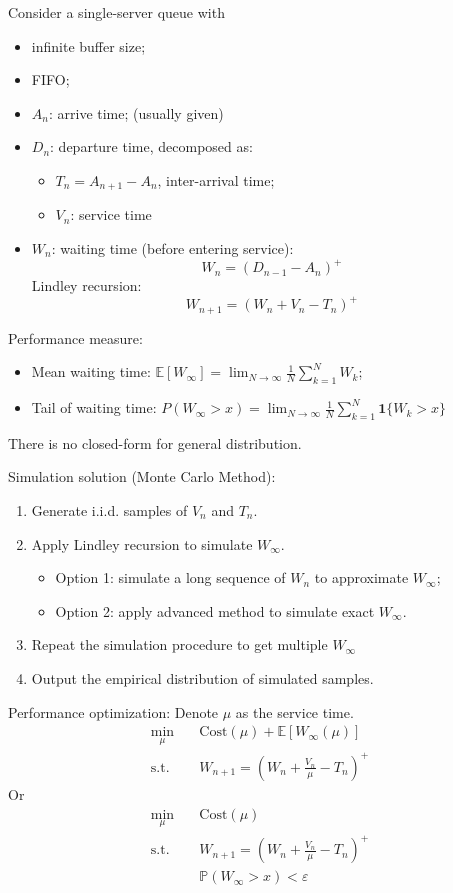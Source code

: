 \begin{example}
Consider a single-server queue with
\begin{itemize}
\item
infinite buffer size;
\item
FIFO;
\item
$A_n$: arrive time; (usually given)
\item
$D_n$: departure time, decomposed as:
\begin{itemize}
\item
$T_n=A_{n+1} - A_n$, inter-arrival time;
\item
$V_n$: service time
\end{itemize}
\item
$W_n$: waiting time (before entering service):
\[
W_n = (D_{n-1} - A_n)^+
\]
Lindley recursion:
\[
W_{n+1} = (W_n  + V_n - T_n)^+
\]
\end{itemize}
Performance measure:
\begin{itemize}
\item
Mean waiting time: $\mathbb{E}[W_\infty] = \lim_{N\to\infty}\frac{1}{N}\sum_{k=1}^NW_k$;
\item
Tail of waiting time: $P(W_\infty > x) = \lim_{N\to\infty}\frac{1}{N}\sum_{k=1}^N\bm 1\{W_k >x\}$
\end{itemize}
There is no closed-form for general distribution.
\end{example}

\begin{remark}
Simulation solution (Monte Carlo Method):
\begin{enumerate}
\item
Generate i.i.d. samples of $V_n$ and $T_n$.
\item
Apply Lindley recursion to simulate $W_\infty$.
\begin{itemize}
\item
Option 1: simulate a long sequence of $W_n$ to approximate $W_\infty$;
\item
Option 2: apply advanced method to simulate exact $W_\infty$.
\end{itemize}
\item
Repeat the simulation procedure to get multiple $W_\infty$
\item
Output the empirical distribution of simulated samples.
\end{enumerate}
\end{remark}

Performance optimization:
Denote $\mu$ as the service time.
\[
\begin{aligned}
\min_{\mu}&\quad\text{Cost}(\mu) + \mathbb{E}[W_\infty(\mu)]\\
\mbox{s.t.}&\quad W_{n+1} =\left(
W_n +\frac{V_n}{\mu} - T_n
\right)^+
\end{aligned}
\]
Or
\[
\begin{aligned}
\min_{\mu}&\quad\text{Cost}(\mu)\\
\mbox{s.t.}&\quad W_{n+1} =\left(
W_n +\frac{V_n}{\mu} - T_n
\right)^+\\
&\quad \mathbb{P}(W_\infty > x) < \varepsilon
\end{aligned}
\]

